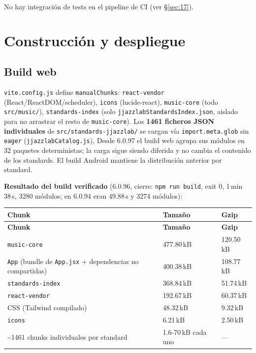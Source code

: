\documentclass[a4paper,11pt,oneside]{report}
\newcommand{\Sref}[1]{\S\ref{#1}}
\begin{document}
No hay integración de tests en el pipeline de CI (ver \Sref{sec:17}).

\chapter{Construcción y despliegue}
\label{sec:16}

\section{Build web}
\label{sec:16.1}

\begingroup\sloppy
\lstinline!vite.config.js! define \lstinline!manualChunks!: \lstinline!react-vendor! (React/ReactDOM/scheduler), \lstinline!icons! (lucide-react), \lstinline!music-core! (todo \lstinline!src/music/!), \lstinline!standards-index! (solo \lstinline!jjazzlabStandardsIndex.json!, aislado para no arrastrar el resto de \lstinline!music-core!). Los \textbf{1461 ficheros JSON individuales} de \lstinline!src/standards-jjazzlab/! se cargan vía \lstinline!import.meta.glob! sin \lstinline!eager! (\lstinline!jjazzlabCatalog.js!), Desde 6.0.97 el build web agrupa sus módulos en 32 paquetes deterministas; la carga sigue siendo diferida y no cambia el contenido de los standards. El build Android mantiene la distribución anterior por standard.\endgroup

\textbf{Resultado del build verificado} (6.0.96, cierre: \lstinline!npm run build!, exit 0, 1\,min 38\,s, 3280 módulos; en 6.0.94 eran 49.88\,s y 3274 módulos):

\begin{center}
\begin{longtable}{L{4.4cm}C{3.0cm}C{3.0cm}}
\toprule
{}\textbf{Chunk} & \textbf{Tamaño} & \textbf{Gzip}\\
\midrule
\endfirsthead
{}\textbf{Chunk} & \textbf{Tamaño} & \textbf{Gzip}\\
\midrule
\endhead
\bottomrule
\endlastfoot
\lstinline!music-core! & 477.80\,kB & 120.50\,kB\\
\lstinline!App! (bundle de \lstinline!App.jsx! + dependencias no compartidas) & 400.38\,kB & 108.77\,kB\\
\lstinline!standards-index! & 368.84\,kB & 51.74\,kB\\
\lstinline!react-vendor! & 192.67\,kB & 60.37\,kB\\
CSS (Tailwind compilado) & 48.32\,kB & 9.32\,kB\\
\lstinline!icons! & 6.21\,kB & 2.50\,kB\\
\textasciitilde1461 chunks individuales por standard & 1.6-70\,kB cada uno & ---\\
\end{longtable}
\end{center}
\end{document}
